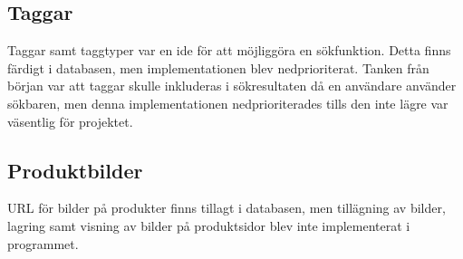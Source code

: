 \documentclass[a4paper]{article}
\begin{document}
\subsection{Taggar}
Taggar samt taggtyper var en ide för att möjliggöra en sökfunktion. Detta finns färdigt i databasen, men implementationen blev nedprioriterat. Tanken från början var att taggar skulle inkluderas i sökresultaten då en användare använder sökbaren, men denna implementationen nedprioriterades tills den inte lägre var väsentlig för projektet.
%
\subsection{Produktbilder}
URL för bilder på produkter finns tillagt i databasen, men tillägning av bilder, lagring samt visning av bilder på produktsidor blev inte implementerat i programmet.
%
\end{document}
